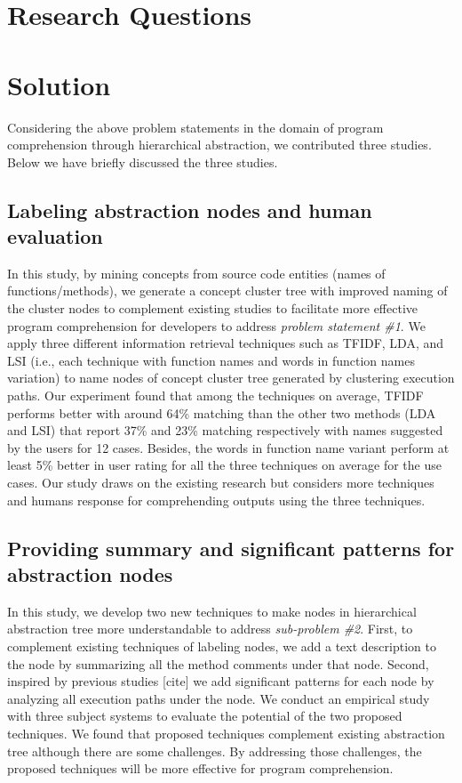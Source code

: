\section{Research Questions}    

\section{Solution}
Considering the above problem statements in the domain of program comprehension through hierarchical abstraction, we contributed three studies. Below we have briefly discussed the three studies.  

\subsection{Labeling abstraction nodes and human evaluation}

In this study, by mining concepts from source code entities (names of functions/methods), we generate a concept cluster tree
with improved naming of the cluster nodes to complement existing studies to facilitate more effective program comprehension for
developers to address \emph{problem statement \#1}. We apply three different information retrieval techniques such as TFIDF, LDA, and LSI (i.e., each technique with function
names and words in function names variation) to name nodes of concept cluster tree generated by clustering execution paths. Our experiment found that among the techniques on average, TFIDF performs better with around 64\% matching than the other
two methods (LDA and LSI) that report 37\% and 23\% matching respectively with names suggested by the users for 12 cases. Besides,
the words in function name variant perform at least 5\% better in user rating for all the three techniques on average for the use cases.
Our study draws on the existing research but considers more techniques and humans response for comprehending outputs using the three
techniques.

\subsection{Providing summary and significant patterns for abstraction nodes}

In this study, we develop two new techniques to make nodes in hierarchical abstraction tree more understandable to address \emph{sub-problem \#2}. First, to complement existing techniques of labeling nodes, we add a text description to the node by summarizing all the method comments under that node. Second, inspired by previous studies [cite] we add significant patterns for each node by analyzing all execution paths under the node. We conduct an empirical study with three subject systems to evaluate the potential of the two proposed techniques. We found that proposed techniques complement existing abstraction tree although there are some challenges. By addressing those challenges, the proposed techniques will be more effective for program comprehension. 

